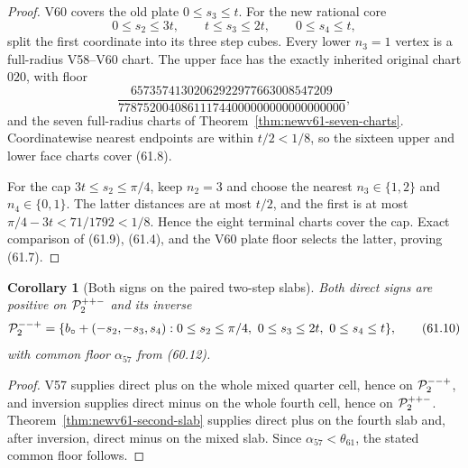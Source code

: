 \documentclass[11pt,oneside]{article}
\newtheorem{corollary}[theorem]{Corollary}
\theoremstyle{definition}
\theoremstyle{remark}
\begin{document}
\begin{proof}
V60 covers the old plate \(0\le s_3\le t\).  For the new rational
core
\[
 0\le s_2\le3t,\qquad t\le s_3\le2t,\qquad
 0\le s_4\le t,                                       \tag{61.8}
\]
split the first coordinate into its three step cubes.  Every lower
\(n_3=1\) vertex is a full-radius V58--V60 chart.  The upper face
has the exactly inherited original chart \(020\), with floor
\[
 \frac{65735741302062922977663008547209}
 {778752004086111744000000000000000000},              \tag{61.9}
\]
and the seven full-radius charts of
Theorem~\ref{thm:newv61-seven-charts}.  Coordinatewise nearest
endpoints are within \(t/2<1/8\), so the sixteen upper and lower
face charts cover (61.8).

For the cap \(3t\le s_2\le\pi/4\), keep \(n_2=3\) and choose the
nearest \(n_3\in\{1,2\}\) and \(n_4\in\{0,1\}\).  The latter
distances are at most \(t/2\), and the first is at most
\(\pi/4-3t<71/1792<1/8\).  Hence the eight terminal charts cover
the cap.  Exact comparison of (61.9), (61.4), and the V60 plate
floor selects the latter, proving (61.7).
\end{proof}

\begin{corollary}[Both signs on the paired two-step slabs]
\label{cor:newv61-paired-slabs}
Both direct signs are positive on \({\cal P}^{++-}_2\) and its
inverse
\[
 {\cal P}^{--+}_2=
 \{b_\circ+(-s_2,-s_3,s_4):
 0\le s_2\le\pi/4,\ 0\le s_3\le2t,\ 0\le s_4\le t\}, \tag{61.10}
\]
with common floor \(\alpha_{57}\) from (60.12).
\end{corollary}

\begin{proof}
V57 supplies direct plus on the whole mixed quarter cell, hence on
\({\cal P}^{--+}_2\), and inversion supplies direct minus on the
whole fourth cell, hence on \({\cal P}^{++-}_2\).
Theorem~\ref{thm:newv61-second-slab} supplies direct plus on the
fourth slab and, after inversion, direct minus on the mixed slab.
Since \(\alpha_{57}<\theta_{61}\), the stated common floor follows.
\end{proof}
\end{document}
